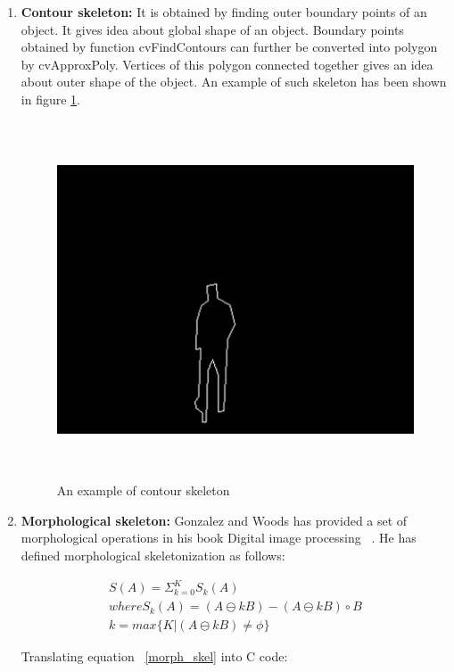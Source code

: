 \begin{enumerate}
\item \textbf{Contour skeleton:} It is obtained by finding outer
boundary points of an object. It gives idea about global shape of an
object. Boundary points obtained by function cvFindContours can further
be converted into polygon by cvApproxPoly. Vertices of this polygon
connected together gives an idea about outer shape of the object. An
example of such skeleton has been shown in figure
\ref{contour_skeleton}.

\begin{figure}[!t]
\centering
\includegraphics[height=300pt]{Figures/contour_skeleton}
\caption{An example of contour skeleton}
\label{contour_skeleton}
\end{figure}

\item \textbf{Morphological skeleton:} Gonzalez and Woods has provided
a set of morphological operations in his book Digital image processing
~\cite{35}. He has defined morphological skeletonization as follows:

	\begin{eqnarray}
	S(A) = \Sigma ^K _{k = 0} S_k(A) \nonumber \label{morph_skel}\\
		where S_k(A) = (A \ominus kB) - (A \ominus kB)
\circ B \nonumber\\
		k = max \{ K | (A \ominus kB) \neq \phi\}
	\end{eqnarray}

Translating equation ~\ref{morph_skel} into C code:


\end{enumerate}
